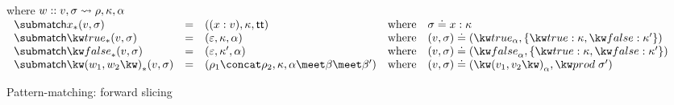 \begin{figure}[H]
\flushleft {}
 where $w :: v, \sigma \rightsquigarrow \rho, \kappa, \alpha$ \\
 \small
\vspace{3mm}
$\begin{array}{lllll}
   \matchFwdF{x}(v, \sigma)
   &=&
   (\bind{x}{v}, \kappa, \TT)
   &\text{where}&
   \sigma \eq \elimVar{x}{\kappa}
   \\
   \matchFwdF{\matchTrueNew}(v, \sigma)
   &=&
   (\seqEmpty, \kappa, \alpha)
   &\text{where}&
   (v, \sigma) \eq (\annTrue{\alpha}, \elimBool{\kappa}{\kappa'})
   \\
   \matchFwdF{\matchFalseNew}(v, \sigma)
   &=&
   (\seqEmpty, \kappa', \alpha)
   &\text{where}&
   (v, \sigma) \eq (\annFalse{\alpha}, \elimBool{\kappa}{\kappa'})
   \\
   \matchFwdF{\matchPair{w_1}{w_2}}(v, \sigma)
   &=&
   (\rho_1 \concat \rho_2, \kappa, \alpha \meet \beta \meet \beta')
   &\text{where}&
   (v, \sigma) \eq (\annPair{v_1}{v_2}{\alpha}, \elimProd{\sigma'})
\end{array}$
\vspace{5mm}
\flushleft {}
\caption{Pattern-matching: forward slicing}
\end{figure}
